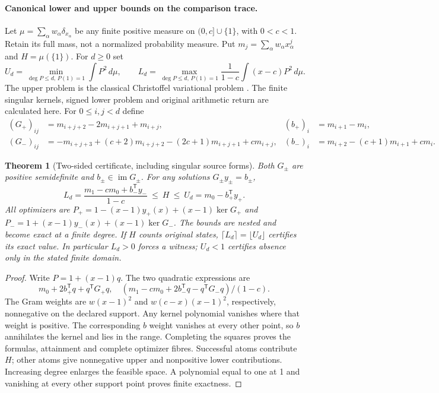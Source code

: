 \documentclass[10pt,a4paper]{article}
\newtheorem{theorem}{Theorem}
\begin{document}
\paragraph{Canonical lower and upper bounds on the comparison trace.}
Let $\mu=\sum_\alpha w_\alpha\delta_{x_\alpha}$ be any finite positive measure
on $(0,c]\cup\{1\}$, with $0<c<1$. Retain its full mass, not a normalized
probability measure. Put $m_j=\sum_\alpha w_\alpha x_\alpha^j$ and
$H=\mu(\{1\})$. For $d\ge0$ set
\[
 U_d=\min_{\deg P\le d,\,P(1)=1}\int P^2\,d\mu,\qquad
 L_d=\max_{\deg P\le d,\,P(1)=1}\frac1{1-c}\int(x-c)P^2\,d\mu.
 \tag{3}
\]
The upper problem is the classical Christoffel variational problem
\cite[\S2.1, (2.2)--(2.3)]{Las}. The finite singular kernels, signed lower
problem and original arithmetic return are calculated here.
For $0\le i,j<d$ define
\[
 \begin{aligned}
 (G_+)_{ij}&=m_{i+j+2}-2m_{i+j+1}+m_{i+j},&
 (b_+)_i&=m_{i+1}-m_i,\\
 (G_-)_{ij}&=-m_{i+j+3}+(c+2)m_{i+j+2}-(2c+1)m_{i+j+1}+cm_{i+j},&
 (b_-)_i&=m_{i+2}-(c+1)m_{i+1}+cm_i.
 \end{aligned}\tag{4}
\]
\begin{theorem}[Two-sided certificate, including singular source forms]
Both $G_\pm$ are positive semidefinite and $b_\pm\in\operatorname{im}G_\pm$.
For any solutions $G_\pm y_\pm=b_\pm$,
\[
 \boxed{L_d=\frac{m_1-cm_0+b_-^{\mathsf T}y_-}{1-c}
 \ \le\ H\ \le\ U_d=m_0-b_+^{\mathsf T}y_+.}\tag{5}
\]
All optimizers are $P_+=1-(x-1)y_+(x)+(x-1)\ker G_+$ and
$P_-=1+(x-1)y_-(x)+(x-1)\ker G_-$.
The bounds are nested and become exact at a finite degree.
If $H$ counts original states, $\lceil L_d\rceil=\lfloor U_d\rfloor$
certifies its exact value. In particular $L_d>0$ forces a witness;
$U_d<1$ certifies absence only in the stated finite domain.
\end{theorem}
\begin{proof}
Write $P=1+(x-1)q$. The two quadratic expressions are
\[
 m_0+2b_+^{\mathsf T}q+q^{\mathsf T}G_+q,
 \quad (m_1-cm_0+2b_-^{\mathsf T}q-q^{\mathsf T}G_-q)/(1-c).
\]
The Gram weights are $w(x-1)^2$ and $w(c-x)(x-1)^2$, respectively,
nonnegative on the declared support. Any kernel polynomial vanishes where
that weight is positive. The corresponding $b$ weight vanishes at every
other point, so $b$ annihilates the kernel and lies in the range.
Completing the squares proves the formulas, attainment and complete optimizer
fibres. Successful atoms contribute $H$; other atoms give nonnegative upper
and nonpositive lower contributions. Increasing degree enlarges the feasible
space. A polynomial equal to one at 1 and vanishing at every other support
point proves finite exactness.
\end{proof}
\end{document}
